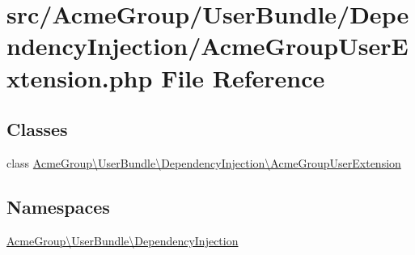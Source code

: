 \hypertarget{_acme_group_user_extension_8php}{\section{src/\+Acme\+Group/\+User\+Bundle/\+Dependency\+Injection/\+Acme\+Group\+User\+Extension.php File Reference}
\label{_acme_group_user_extension_8php}
}
\subsection*{Classes}
\begin{DoxyCompactItemize}
\item 
class \hyperlink{class_acme_group_1_1_user_bundle_1_1_dependency_injection_1_1_acme_group_user_extension}{Acme\+Group\textbackslash{}\+User\+Bundle\textbackslash{}\+Dependency\+Injection\textbackslash{}\+Acme\+Group\+User\+Extension}
\end{DoxyCompactItemize}
\subsection*{Namespaces}
\begin{DoxyCompactItemize}
\item 
 \hyperlink{namespace_acme_group_1_1_user_bundle_1_1_dependency_injection}{Acme\+Group\textbackslash{}\+User\+Bundle\textbackslash{}\+Dependency\+Injection}
\end{DoxyCompactItemize}
